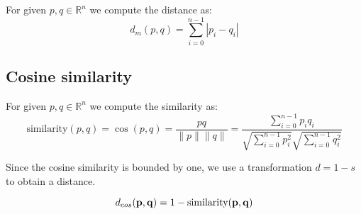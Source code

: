 For given $p, q \in \mathbb{R}^n$ we compute the distance as:
\begin{equation}
d_m({p},{q}) = {\sum_{i=0}^{n-1} |p_i - q_i|}    
\end{equation}


\subsection{Cosine similarity}

For given $p, q \in \mathbb{R}^n$ we compute the similarity as:
\begin{equation}
\text{similarity}({p},{q}) = \cos ({p},{q})= \frac{pq}{\|{p}\| \|{q}\|} = \frac{ \sum_{i=0}^{n-1}{p_i q_i} }{ \sqrt{\sum_{i=0}^{n-1}{p_i^2}} \sqrt{\sum_{i=0}^{n-1}{q_i^2}} }
\end{equation}

Since the cosine similarity is bounded by one, we use a transformation $d = 1 - s$ to obtain a distance.

\begin{equation}
    d_{cos}({\bf p},{\bf q}) = 1 - \text{similarity}({\bf p},{\bf q})
\end{equation}